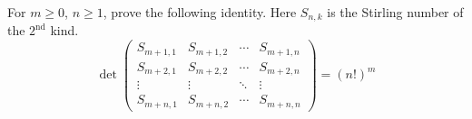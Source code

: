 \documentclass[11pt,letterpaper]{article}
\begin{document}
\begin{quest}[\textcolor{red}{Determinant of a matrix of Stirling Numbers}]
    For $m\geq0$, $n\geq 1$, prove the following identity. Here $S_{n,k}$ is the Stirling number of the $2^{\text{nd}}$ kind.
    \[\det\begin{pmatrix}S_{m+1,1}&S_{m+1,2}&\cdots&S_{m+1,n}\\S_{m+2,1}&S_{m+2,2}&\cdots&S_{m+2,n}\\\vdots&\vdots&\ddots&\vdots\\S_{m+n,1}&S_{m+n,2}&\cdots&S_{m+n,n}\end{pmatrix}=(n!)^m\]
\end{quest}
\end{document}

